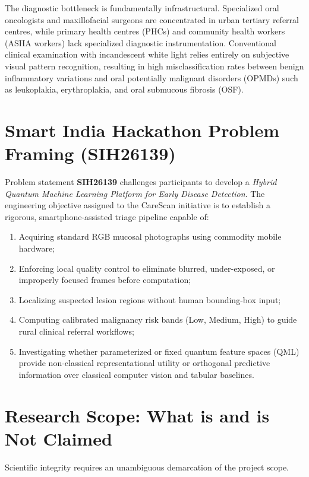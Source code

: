 \documentclass[11pt,a4paper]{report}
\begin{document}
The diagnostic bottleneck is fundamentally infrastructural. Specialized oral oncologists and maxillofacial surgeons are concentrated in urban tertiary referral centres, while primary health centres (PHCs) and community health workers (ASHA workers) lack specialized diagnostic instrumentation. Conventional clinical examination with incandescent white light relies entirely on subjective visual pattern recognition, resulting in high misclassification rates between benign inflammatory variations and oral potentially malignant disorders (OPMDs) such as leukoplakia, erythroplakia, and oral submucous fibrosis (OSF).

\section{Smart India Hackathon Problem Framing (SIH26139)}
Problem statement \textbf{SIH26139} challenges participants to develop a \textit{Hybrid Quantum Machine Learning Platform for Early Disease Detection}. The engineering objective assigned to the CareScan initiative is to establish a rigorous, smartphone-assisted triage pipeline capable of:
\begin{enumerate}
  \item Acquiring standard RGB mucosal photographs using commodity mobile hardware;
  \item Enforcing local quality control to eliminate blurred, under-exposed, or improperly focused frames before computation;
  \item Localizing suspected lesion regions without human bounding-box input;
  \item Computing calibrated malignancy risk bands (Low, Medium, High) to guide rural clinical referral workflows;
  \item Investigating whether parameterized or fixed quantum feature spaces (QML) provide non-classical representational utility or orthogonal predictive information over classical computer vision and tabular baselines.
\end{enumerate}

\section{Research Scope: What is and is Not Claimed}
Scientific integrity requires an unambiguous demarcation of the project scope. 
\end{document}
